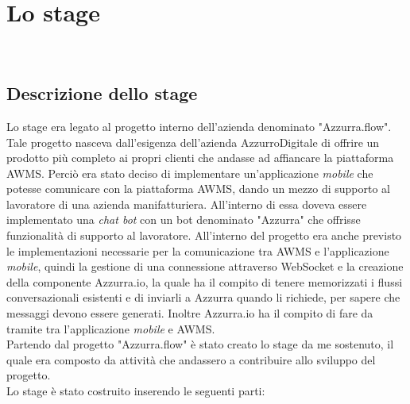 
\chapter{Lo stage}
\label{cap:descrizione-stage}

\\

\section{Descrizione dello stage}
Lo stage era legato al progetto interno dell'azienda denominato "Azzurra.flow". Tale progetto nasceva dall'esigenza dell'azienda AzzurroDigitale di offrire un prodotto più completo ai propri clienti che andasse ad affiancare la piattaforma \gls{AWMS}. Perciò era stato deciso di implementare un’applicazione \emph{mobile} che potesse comunicare con la piattaforma \gls{AWMS}, dando un mezzo di supporto al lavoratore di una azienda manifatturiera. All'interno di essa doveva essere implementato una \emph{chat bot} con un \gls{bot}\ap{[g]} denominato "Azzurra" che offrisse funzionalità di supporto al lavoratore. All'interno del progetto era anche previsto le implementazioni necessarie per la comunicazione tra \gls{AWMS} e l'applicazione \emph{mobile}, quindi la gestione di una connessione attraverso \gls{WebSocket}\ap{[g]} e la creazione della componente Azzurra.io, la quale ha il compito di tenere memorizzati i flussi conversazionali esistenti e di inviarli a Azzurra quando li richiede, per sapere che messaggi devono essere generati. Inoltre Azzurra.io ha il compito di fare da tramite tra l'applicazione \emph{mobile} e \gls{AWMS}.\\
Partendo dal progetto "Azzurra.flow" è stato creato lo stage da me sostenuto, il quale era composto da attività che andassero a contribuire allo sviluppo del progetto. \\
Lo stage è stato costruito inserendo le seguenti parti:

